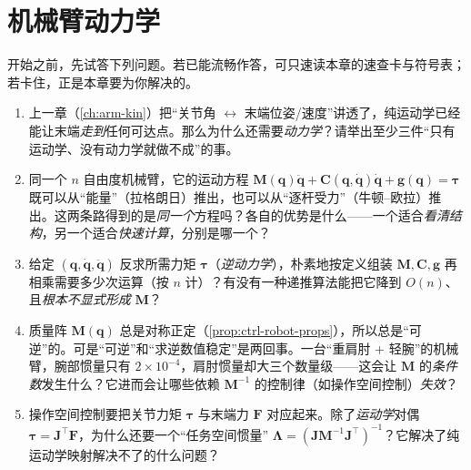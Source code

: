 \chapter{机械臂动力学}
\label{ch:arm-dyn}


\begin{practice}[前置自测]
开始之前，先试答下列问题。若已能流畅作答，可只速读本章的速查卡与符号表；若卡住，正是本章要为你解决的。
\begin{enumerate}
  \item 上一章（\cref{ch:arm-kin}）把“关节角 $\leftrightarrow$ 末端位姿/速度”讲透了，纯运动学已经能让末端\emph{走到}任何可达点。那么为什么还需要\emph{动力学}？请举出至少三件“只有运动学、没有动力学就做不成”的事。
  \item 同一个 $n$ 自由度机械臂，它的运动方程 $\mathbf{M}(\mathbf{q})\ddot{\mathbf{q}}+\mathbf{C}(\mathbf{q},\dot{\mathbf{q}})\dot{\mathbf{q}}+\mathbf{g}(\mathbf{q})=\boldsymbol{\tau}$ 既可以从“能量”（拉格朗日）推出，也可以从“逐杆受力”（牛顿--欧拉）推出。这两条路得到的是\emph{同一个}方程吗？各自的优势是什么——一个适合\emph{看清结构}，另一个适合\emph{快速计算}，分别是哪一个？
  \item 给定 $(\mathbf{q},\dot{\mathbf{q}},\ddot{\mathbf{q}})$ 反求所需力矩 $\boldsymbol{\tau}$（\emph{逆动力学}），朴素地按定义组装 $\mathbf{M},\mathbf{C},\mathbf{g}$ 再相乘需要多少次运算（按 $n$ 计）？有没有一种递推算法能把它降到 $O(n)$、且\emph{根本不显式形成} $\mathbf{M}$？
  \item 质量阵 $\mathbf{M}(\mathbf{q})$ 总是对称正定（\cref{prop:ctrl-robot-props}），所以总是“可逆”的。可是“可逆”和“求逆数值稳定”是两回事。一台“重肩肘 + 轻腕”的机械臂，腕部惯量只有 $2\times10^{-4}$，肩肘惯量却大三个数量级——这会让 $\mathbf{M}$ 的\emph{条件数}发生什么？它进而会让哪些依赖 $\mathbf{M}^{-1}$ 的控制律（如操作空间控制）\emph{失效}？
  \item 操作空间控制要把关节力矩 $\boldsymbol{\tau}$ 与末端力 $\mathbf{F}$ 对应起来。除了\emph{运动学}对偶 $\boldsymbol{\tau}=\mathbf{J}^\top\mathbf{F}$，为什么还要一个“任务空间惯量” $\boldsymbol{\Lambda}=(\mathbf{J}\mathbf{M}^{-1}\mathbf{J}^\top)^{-1}$？它解决了纯运动学映射解决不了的什么问题？
\end{enumerate}
\end{practice}

